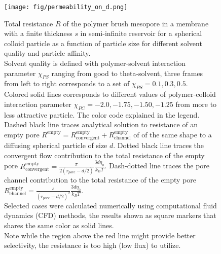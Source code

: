\documentclass[12pt, a4paper]{article}
\begin{document}
\begin{figure}
    \centering
    \texttt{[image: fig/permeability\_on\_d.png]}
    \caption{
        Total resistance $R$ of the polymer brush mesopore in a membrane with a finite thickness $s$ in semi-infinite reservoir for a spherical colloid particle as a function of particle size for different solvent quality and particle affinity.
        \\
        Solvent quality is defined with polymer-solvent interaction parameter $\chi_{PS}$ ranging from good to theta-solvent, three frames from left to right corresponds to a set of $\chi_{PS} = {0.1, 0.3, 0.5}$.
        \\
        Colored solid lines corresponds to different values of polymer-colloid interaction parameter $\chi_{PC} = {-2.0, -1.75, -1.50, -1.25}$ from more to less attractive particle. 
        The color code explained in the legend.
        \\
        Dashed black line traces analytical solution to resistance of an empty pore $R^{\textrm{empty}} = R^{\textrm{empty}}_{\textrm{convergent}} + R^{\textrm{empty}}_{\textrm{channel}}$ of of the same shape to a diffusing spherical particle of size $d$.
        Dotted black line traces the convergent flow contribution to the total resistance of the empty pore $R^{\textrm{empty}}_{\textrm{convergent}} = \frac{\pi}{2 (r_{pore} - d/2)} \frac{3 d \eta_0}{k_B T}$.
        Dash-dotted line traces the pore channel contribution to the total resistance of the empty pore
        $R^{\textrm{empty}}_{\textrm{channel}} = \frac{s}{(r_{pore} - d/2)^2} \frac{3  d \eta_0}{k_B T}$.
        \\
        Selected cases were calculated numerically using computational fluid dynamics (CFD) methods, the results shown as square markers that shares the same color as solid lines.
        \\
        Note while the region above the red line might provide better selectivity, the resistance is too high (low flux) to utilize.
        }
        \label{fig:resistivity_on_d}
\end{figure}
\end{document}
